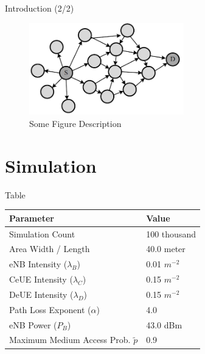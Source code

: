 \documentclass{beamer}
\begin{document}
\begin{frame}{Introduction (2/2)}
    \begin{figure}[t]
        \centering
        \includegraphics[width=0.6\textwidth]{figures/Fig_1-1.png}
        \caption{Some Figure Description}
    \end{figure}
\end{frame}

\section{Simulation}

\begin{frame}{Table}
    \begin{center}
        \begin{tabular}{ | l | l | }
            \hline
                Parameter                                   &       Value               \\ \hline
                Simulation Count                            &       100 thousand        \\ \hline
                Area Width / Length                         &       40.0 meter          \\ \hline
                eNB Intensity ($\lambda_{B}$)               &       0.01 $m^{-2}$       \\ \hline
                CeUE Intensity ($\lambda_{C}$)              &       0.15 $m^{-2}$       \\ \hline
                DeUE Intensity ($\lambda_{D}$)              &       0.15 $m^{-2}$       \\ \hline
                Path Loss Exponent ($\alpha$)               &       4.0                 \\ \hline
                eNB Power ($P_{B}$)                         &       43.0 dBm            \\ \hline
                Maximum Medium Access Prob. $\tilde{p}$     &       0.9                 \\
            \hline
        \end{tabular}
    \end{center}
\end{frame}
\end{document}
